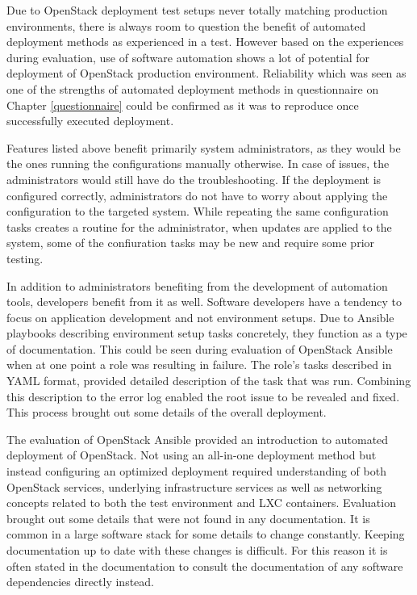 \documentclass[officiallayout]{tktla}
\begin{document}
Due to OpenStack deployment test setups never totally matching production
environments, there is always room to question the benefit of automated
deployment methods as experienced in a test. However based on the experiences
during evaluation, use of software automation shows a lot of potential for
deployment of OpenStack production environment. Reliability which was seen as
one of the strengths of automated deployment methods in questionnaire on
Chapter \ref{questionnaire} could be confirmed as it was to reproduce once
successfully executed deployment.

Features listed above benefit primarily system administrators, as they would be
the ones running the configurations manually otherwise. In case of issues, the
administrators would still have do the troubleshooting. If the deployment is
configured correctly, administrators do not have to worry about applying the
configuration to the targeted system. While repeating the same configuration
tasks creates a routine for the administrator, when updates are applied to the
system, some of the confiuration tasks may be new and require some prior
testing.

In addition to administrators benefiting from the development of automation
tools, developers benefit from it as well. Software developers have a tendency
to focus on application development and not environment setups. Due to Ansible
playbooks describing environment setup tasks concretely, they function as a
type of documentation. This could be seen during evaluation of OpenStack
Ansible when at one point a role was resulting in failure. The role's tasks
described in YAML format, provided detailed description of the task that was
run. Combining this description to the error log enabled the root issue to be
revealed and fixed. This process brought out some details of the overall
deployment.

The evaluation of OpenStack Ansible provided an introduction to automated
deployment of OpenStack. Not using an all-in-one deployment method but instead
configuring an optimized deployment required understanding of both OpenStack
services, underlying infrastructure services as well as networking concepts
related to both the test environment and LXC containers. Evaluation brought out
some details that were not found in any documentation. It is common in a large
software stack for some details to change constantly. Keeping documentation up
to date with these changes is difficult. For this reason it is often stated in
the documentation to consult the documentation of any software dependencies
directly instead.
\end{document}
